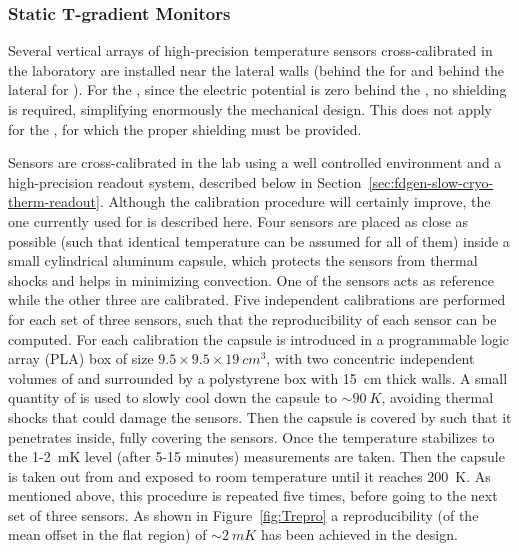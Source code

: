 
\subsubsection{Static T-gradient Monitors}
\label{sp-cisc-thermom-static-t}

Several vertical arrays of high-precision temperature sensors cross-calibrated in the laboratory are installed near the lateral walls
(behind the  for \single and behind the lateral %
 for \dual). 
For the , since the electric potential is zero behind the , no \efield shielding is required, simplifying enormously the mechanical design.
This does not apply for the , for which the proper shielding must be provided. 


Sensors are cross-calibrated in the lab using a well controlled environment and a high-precision readout system, described below in Section~\ref{sec:fdgen-slow-cryo-therm-readout}. %
Although the calibration procedure will certainly improve, the one currently used for  is described here.
Four sensors are placed as close as possible (such that identical temperature can be assumed for all of them) inside a small cylindrical aluminum capsule,
which protects the sensors from thermal shocks and helps in minimizing convection.
One of the sensors acts as reference while the other three are %
calibrated. Five independent calibrations
are performed for each set of three sensors, such that the reproducibility of each sensor can be computed. For each calibration 
the capsule is introduced in a programmable logic array (PLA) box of size \(9.5\times9.5\times\SI{19}{cm^3}\), with two concentric independent volumes of \lar
and surrounded by a polystyrene box with \SI{15}{cm} thick walls. A small quantity of \lar is used to slowly
cool down the capsule to $\sim\SI{90}{K}$, avoiding thermal shocks that could damage the sensors.
Then the capsule is covered by
  \lar such that it penetrates
inside, fully covering the sensors. Once the temperature stabilizes to the 1-\SI{2}{mK} level (after 5-15 minutes) measurements are taken. Then the capsule is taken out from \lar
and exposed to room temperature until it reaches \SI{200}{K}. As mentioned above, this procedure is repeated five times, before going to the next set of three sensors.  
As shown in Figure~\ref{fig:Trepro} a reproducibility (\rms of the mean offset in the flat region) of $\sim \SI{2}{mK}$ has been achieved in the  design.  

